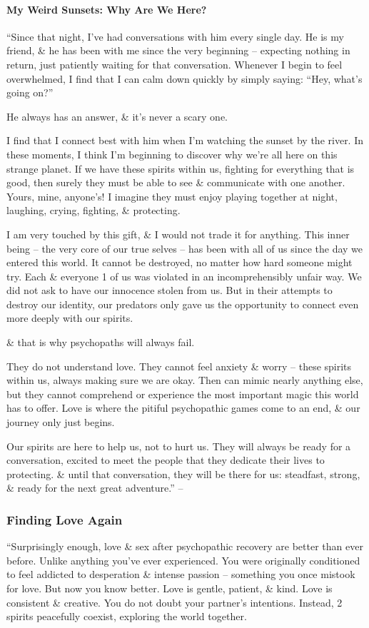\documentclass{article}
\numberwithin{equation}{section}
\begin{document}
\paragraph{My Weird Sunsets: Why Are We Here?}
``Since that night, I've had conversations with him every single day. He is my friend, \& he has been with me since the very beginning -- expecting nothing in return, just patiently waiting for that conversation. Whenever I begin to feel overwhelmed, I find that I can calm down quickly by simply saying: ``Hey, what's going on?''

He always has an answer, \& it's never a scary one.

I find that I connect best with him when I'm watching the sunset by the river. In these moments, I think I'm beginning to discover why we're all here on this strange planet. If we have these spirits within us, fighting for everything that is good, then surely they must be able to see \& communicate with one another. Yours, mine, anyone's! I imagine they must enjoy playing together at night, laughing, crying, fighting, \& protecting.

I am very touched by this gift, \& I would not trade it for anything. This inner being -- the very core of our true selves -- has been with all of us since the day we entered this world. It cannot be destroyed, no matter how hard someone might try. Each \& everyone 1 of us was violated in an incomprehensibly unfair way. We did not ask to have our innocence stolen from us. But in their attempts to destroy our identity, our predators only gave us the opportunity to connect even more deeply with our spirits.

\& that is why psychopaths will always fail.

They do not understand love. They cannot feel anxiety \& worry -- these spirits within us, always making sure we are okay. Then can mimic nearly anything else, but they cannot comprehend or experience the most important magic this world has to offer. Love is where the pitiful psychopathic games come to an end, \& our journey only just begins.

Our spirits are here to help us, not to hurt us. They will always be ready for a conversation, excited to meet the people that they dedicate their lives to protecting. \& until that conversation, they will be there for us: steadfast, strong, \& ready for the next great adventure.'' -- \cite[pp. 179--183]{MacKenzie2015}

\subsubsection{Finding Love Again}
``Surprisingly enough, love \& sex after psychopathic recovery are better than ever before. Unlike anything you've ever experienced. You were originally conditioned to feel addicted to desperation \& intense passion -- something you once mistook for love. But now you know better. Love is gentle, patient, \& kind. Love is consistent \& creative. You do not doubt your partner's intentions. Instead, 2 spirits peacefully coexist, exploring the world together.
\end{document}

